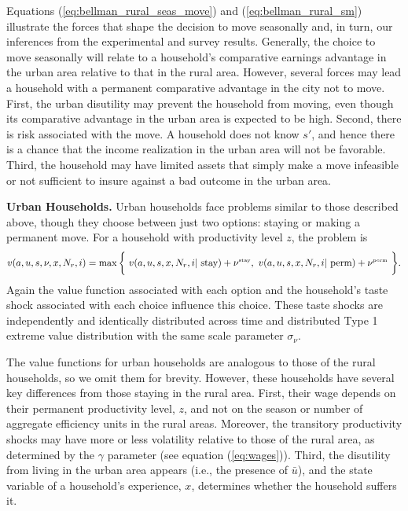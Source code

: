 \documentclass[12pt,pdftex]{article}
\begin{document}
Equations (\ref{eq:bellman_rural_seas_move}) and (\ref{eq:bellman_rural_sm}) illustrate the forces that shape the decision to move seasonally and, in turn, our inferences from the experimental and survey results. Generally, the choice to move seasonally will relate to a household's comparative earnings advantage in the urban area relative to that in the rural area. However, several forces may lead a household with a permanent comparative advantage in the city not to move. First, the urban disutility may prevent the household from moving, even though its comparative advantage in the urban area is expected to be high. Second, there is risk associated with the move. A household does not know $s'$, and hence there is a chance that the income realization in the urban area will not be favorable. Third, the household may have limited assets that simply make a move infeasible or not sufficient to insure against a bad outcome in the urban area.

\textbf{Urban Households.} Urban households face problems similar to those described above, though they choose between just two options: staying or making a permanent move. For a household with productivity level $z$, the problem is
\begin{align}
v(a, u, s, \nu, x, N_r, i) = \max \bigg\{ \ v(a, u, s, x, N_r, i| \ \mbox{stay}) + \nu^{\tiny\mbox{stay}}, \  v(a, u, s, x, N_r,  i| \ \mbox{perm}) + \nu^{\tiny\mbox{perm}} \ \bigg \}.
\label{eq:bellman_urban}
\end{align}
Again the value function associated with each option and the household's taste shock associated with each choice influence this choice. These taste shocks are independently and identically distributed across time and distributed Type 1 extreme value distribution with the same scale parameter $\sigma_{\nu}$.

The value functions for urban households are analogous to those of the rural households, so we omit them for brevity. However, these households have several key differences from those staying in the rural area. First, their wage depends on their permanent productivity level, $z$, and not on the season or number of aggregate efficiency units in the rural areas. Moreover, the transitory productivity shocks may have more or less volatility relative to those of the rural area, as determined by the $\gamma$ parameter (see equation (\ref{eq:wages})). Third, the disutility from living in the urban area appears (i.e., the presence of $\bar u$), and the state variable of a household's experience, $x$, determines whether the household suffers it.
\end{document}
